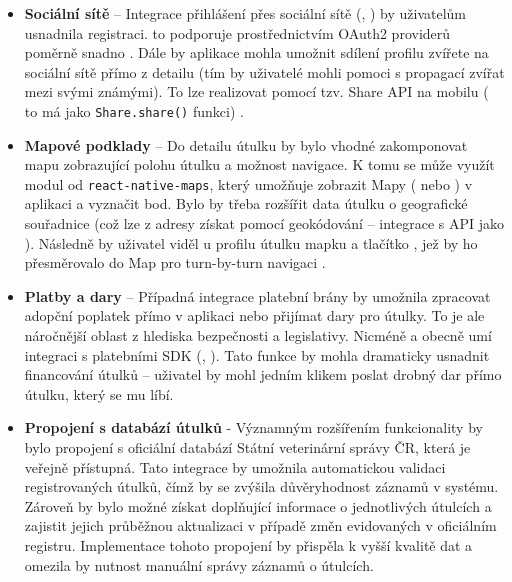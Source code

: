 \documentclass[czech, bp, kiv, he, iso690numb, pdf]{fasthesis}
\begin{document}
    \begin{itemize}
        \item \textbf{Sociální sítě} – Integrace přihlášení přes sociální sítě (, ) by uživatelům usnadnila registraci.  to podporuje prostřednictvím OAuth2 providerů poměrně snadno \cite{appwriteOAuth2025}. Dále by aplikace mohla umožnit sdílení profilu zvířete na sociální sítě přímo z detailu (tím by uživatelé mohli pomoci s propagací zvířat mezi svými známými). To lze realizovat pomocí tzv. Share API na mobilu ( to má jako \texttt{Share.share()} funkci) \cite{expoSharing2025}.

        \item \textbf{Mapové podklady} – Do detailu útulku by bylo vhodné zakomponovat mapu zobrazující polohu útulku a možnost navigace. K tomu se může využít modul od  \texttt{react-native-maps}, který umožňuje zobrazit Mapy ( nebo ) v aplikaci a vyznačit bod. Bylo by třeba rozšířit data útulku o geografické souřadnice (což lze z adresy získat pomocí geokódování – integrace s API jako ). Následně by uživatel viděl u profilu útulku mapku a tlačítko , jež by ho přesměrovalo do Map pro turn-by-turn navigaci \cite{expoReactNativeMaps2025}.

        \item \textbf{Platby a dary} – Případná integrace platební brány by umožnila zpracovat adopční poplatek přímo v aplikaci nebo přijímat dary pro útulky. To je ale náročnější oblast z hlediska bezpečnosti a legislativy. Nicméně  a  obecně umí integraci s platebními SDK (, ). Tato funkce by mohla dramaticky usnadnit financování útulků – uživatel by mohl jedním klikem poslat drobný dar přímo útulku, který se mu líbí.

        \item \textbf{Propojení s databází útulků} - Významným rozšířením funkcionality by bylo propojení s oficiální databází Státní veterinární správy ČR, která je veřejně přístupná. Tato integrace by umožnila automatickou validaci registrovaných útulků, čímž by se zvýšila důvěryhodnost záznamů v systému. Zároveň by bylo možné získat doplňující informace o jednotlivých útulcích a zajistit jejich průběžnou aktualizaci v případě změn evidovaných v oficiálním registru. Implementace tohoto propojení by přispěla k vyšší kvalitě dat a omezila by nutnost manuální správy záznamů o útulcích.
    \end{itemize}
\end{document}
